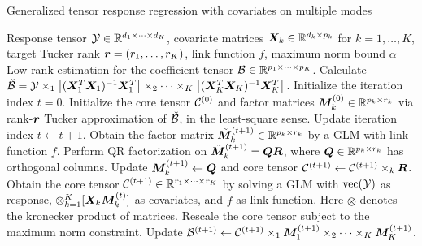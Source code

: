 \documentclass[12pt]{article}
\theoremstyle{plain}
\theoremstyle{definition}
\begin{document}
\begin{algorithm}[t]
\caption{Generalized tensor response regression with covariates on multiple modes}\label{alg:B}
\begin{algorithmic}[1]
\INPUT Response tensor $\mathcal{Y}\in \mathbb{R}^{d_1\times \cdots \times d_K}$, covariate matrices $\bm X_k\in\mathbb{R}^{d_k\times p_k}$ for $k=1,\ldots,K$, target Tucker rank $\bm{r}=(r_1,\ldots,r_K)$, link function $f$, maximum norm bound $\alpha$
\OUTPUT Low-rank estimation for the coefficient tensor $\mathcal{B}\in\mathbb{R}^{p_1\times \cdots\times p_K}$. 
\State Calculate $\check {\mathcal{B}}=\mathcal{Y}\times_1 \left[(\bm X_1^T\bm X_1)^{-1}\bm X^T_1\right] \times_2\cdots\times_K\left[(\bm X_K^T\bm X_K)^{-1}\bm X^T_K\right] $.
\State Initialize the iteration index $t=0$. Initialize the core tensor $\mathcal{C}^{(0)}$ and factor matrices $\bm M^{(0)}_k\in\mathbb{R}^{p_k\times r_k}$ via rank-$\bm{r}$ Tucker approximation of $\check{\mathcal{B}}$, in the least-square sense. 
\State Update iteration index $t \leftarrow t+1$.
\State Obtain the factor matrix $\tilde {\bm M}_k^{(t+1)}\in\mathbb{R}^{p_k\times r_k}$ by a GLM with link function $f$. 
\State Perform QR factorization on $\tilde {\bm M}_k^{(t+1)}=\bm{Q}\bm{R}$, where $\bm{Q}\in\mathbb{R}^{p_k\times r_k}$ has orthogonal columns. 
\State Update $\bm M_k^{(t+1)}\leftarrow \bm{Q}$ and core tensor $\mathcal{C}^{(t+1)}\leftarrow \mathcal{C}^{(t+1)}\times_k \bm{R}$.
\EndFor
\State Obtain the core tensor $\mathcal{C}^{(t+1)}\in\mathbb{R}^{r_1\times\cdots\times r_K}$ by solving a GLM with $\text{vec}(\mathcal{Y})$ as response, $\otimes_{k=1}^K[ \bm X_k\bm M^{(t)}_k]$ as covariates, and $f$ as link function. Here $\otimes$ denotes the kronecker product of matrices. 
\State Rescale the core tensor subject to the maximum norm constraint. 
\State Update $\mathcal{B}^{(t+1)}\leftarrow \mathcal{C}^{(t+1)}\times_1\bm M_1^{(t+1)}\times_2\cdots\times_K\bm M_K^{(t+1)}$.
\EndWhile
\end{algorithmic}
\end{algorithm}
\end{document}
